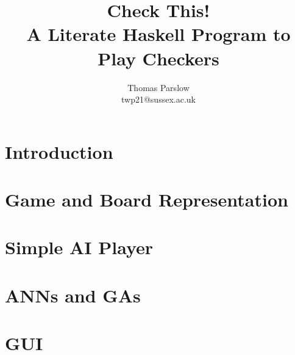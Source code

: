 \documentclass[a4]{report}
\title{Check This!\\A Literate Haskell Program to Play Checkers}
\author{Thomas Parslow\\twp21@sussex.ac.uk}
\begin{document}
\maketitle
\newpage
\tableofcontents
\newpage
\chapter{Introduction}

\chapter{Game and Board Representation}



\chapter{Simple AI Player}



\chapter{ANNs and GAs}


\chapter{GUI}


\printindex
\end{document}
